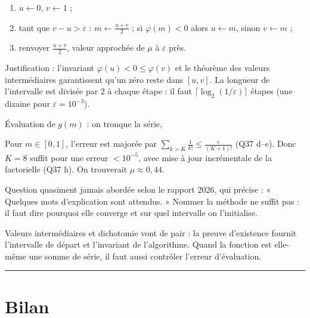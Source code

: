 \documentclass[11pt,a4paper]{article}
\providecommand{\tightlist}{\setlength{\itemsep}{0pt}\setlength{\parskip}{0pt}}
\newcommand{\equationajustee}[1]{%
  \sbox{\boiteequation}{$\displaystyle #1$}%
  \ifdim\wd\boiteequation>\linewidth
    \[\resizebox{\linewidth}{!}{\usebox{\boiteequation}}\]%
  \else
    \[#1\]%
  \fi}
\begin{document}
\begin{enumerate}
\def\labelenumi{\arabic{enumi}.}
\tightlist
\item
  \(u\leftarrow0\), \(v\leftarrow1\) ;
\item
  tant que \(v-u>\varepsilon\) : \(m\leftarrow\frac{u+v}2\) ; si \(\varphi(m)<0\) alors \(u\leftarrow m\), sinon \(v\leftarrow m\) ;
\item
  renvoyer \(\frac{u+v}2\), valeur approchée de \(\mu\) à \(\varepsilon\) près.
\end{enumerate}

Justification : l'invariant \(\varphi(u)<0\le\varphi(v)\) et le théorème des valeurs intermédiaires garantissent qu'un zéro reste dans \([u,v]\). La longueur de l'intervalle est divisée par 2 à chaque étape : il faut \(\lceil\log_2(1/\varepsilon)\rceil\) étapes (une dizaine pour \(\varepsilon=10^{-3}\)).

Évaluation de \(g(m)\) : on tronque la série,

\equationajustee{g(m)\simeq1-e^{-2m}\sum_{k=0}^K\frac{m^{2k}}{(k!)^2}.}

Pour \(m\in[0,1]\), l'erreur est majorée par \(\sum_{k>K}\frac1{k!}\le\frac e{(K+1)!}\) (Q37 d--e). Donc \(K=8\) suffit pour une erreur \(<10^{-5}\), avec mise à jour incrémentale de la factorielle (Q37 h). On trouverait \(\mu\approx0{,}44\).

\begin{jury}

Question quasiment jamais abordée selon le rapport 2026, qui précise : « Quelques mots d'explication sont attendus. » Nommer la méthode ne suffit pas : il faut dire pourquoi elle converge et sur quel intervalle on l'initialise.

\end{jury}

\begin{methode}

Valeurs intermédiaires et dichotomie vont de pair : la preuve d'existence fournit l'intervalle de départ et l'invariant de l'algorithme. Quand la fonction est elle-même une somme de série, il faut aussi contrôler l'erreur d'évaluation.

\end{methode}

\begin{center}\rule{0.5\linewidth}{0.5pt}\end{center}

\hypertarget{bilan}{%
\section{Bilan}\label{bilan}}
\end{document}
